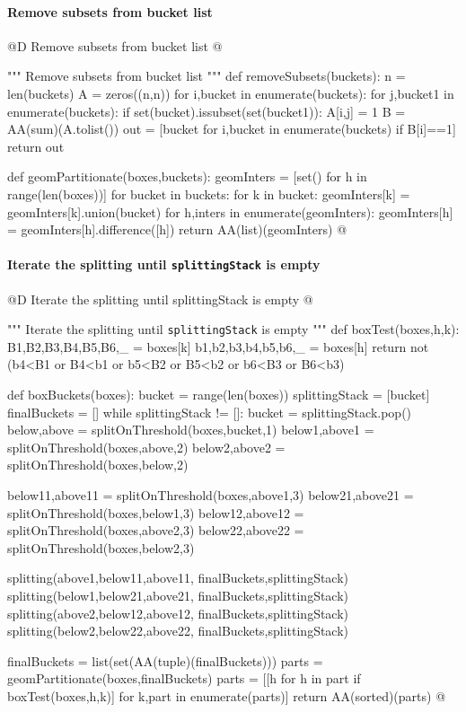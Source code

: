 \documentclass[11pt,oneside]{article}    %
\begin{document}
\paragraph{Remove subsets from bucket list}
@D Remove subsets from bucket list @{
""" Remove subsets from bucket list """
def removeSubsets(buckets):
    n = len(buckets)
    A = zeros((n,n))
    for i,bucket in enumerate(buckets):
        for j,bucket1 in enumerate(buckets):
            if set(bucket).issubset(set(bucket1)):
                A[i,j] = 1
    B = AA(sum)(A.tolist())
    out = [bucket for i,bucket in enumerate(buckets) if B[i]==1]
    return out

def geomPartitionate(boxes,buckets):
    geomInters = [set() for h in range(len(boxes))]
    for bucket in buckets:
        for k in bucket:
            geomInters[k] = geomInters[k].union(bucket)
    for h,inters in enumerate(geomInters):
        geomInters[h] = geomInters[h].difference([h])
    return AA(list)(geomInters)
@}
    


\paragraph{Iterate the splitting until \texttt{splittingStack} is empty}
@D Iterate the splitting until splittingStack is empty
@{""" Iterate the splitting until \texttt{splittingStack} is empty """
def boxTest(boxes,h,k):
    B1,B2,B3,B4,B5,B6,_ = boxes[k]
    b1,b2,b3,b4,b5,b6,_ = boxes[h]
    return not (b4<B1 or B4<b1 or b5<B2 or B5<b2 or b6<B3 or B6<b3)

def boxBuckets(boxes):
    bucket = range(len(boxes))
    splittingStack = [bucket]
    finalBuckets = []
    while splittingStack != []:
        bucket = splittingStack.pop()
        below,above = splitOnThreshold(boxes,bucket,1)
        below1,above1 = splitOnThreshold(boxes,above,2)
        below2,above2 = splitOnThreshold(boxes,below,2) 
               
        below11,above11 = splitOnThreshold(boxes,above1,3)
        below21,above21 = splitOnThreshold(boxes,below1,3)        
        below12,above12 = splitOnThreshold(boxes,above2,3)
        below22,above22 = splitOnThreshold(boxes,below2,3)  
              
        splitting(above1,below11,above11, finalBuckets,splittingStack)
        splitting(below1,below21,above21, finalBuckets,splittingStack)
        splitting(above2,below12,above12, finalBuckets,splittingStack)
        splitting(below2,below22,above22, finalBuckets,splittingStack)
        
        finalBuckets = list(set(AA(tuple)(finalBuckets)))
    parts = geomPartitionate(boxes,finalBuckets)
    parts = [[h for h in part if boxTest(boxes,h,k)] for k,part in enumerate(parts)]
    return AA(sorted)(parts)
@}
\end{document}
